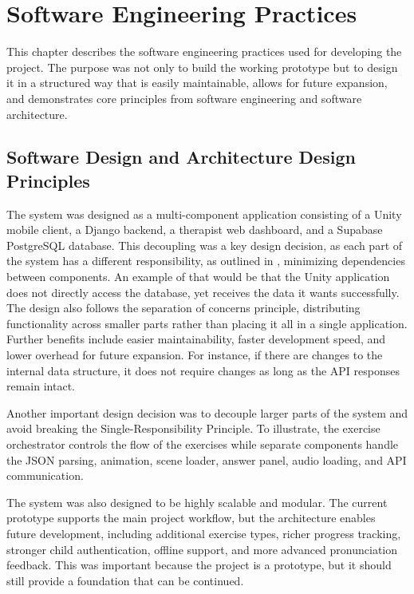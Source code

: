 \chapter{Software Engineering Practices}
\label{ch:software-engineering-practices}

This chapter describes the software engineering practices used for developing the project. The purpose was not only to build the working prototype but to design it in a structured way that is easily maintainable, allows for future expansion, and demonstrates core principles from software engineering and software architecture.

\section{Software Design and Architecture Design Principles}
\label{sec:software-design-and-architecture-design-principles}

The system was designed as a multi-component application consisting of a Unity mobile client, a Django backend, a therapist web dashboard, and a Supabase PostgreSQL database. This decoupling was a key design decision, as each part of the system has a different responsibility, as outlined in , minimizing dependencies between components. An example of that would be that the Unity application does not directly access the database, yet receives the data it wants successfully. The design also follows the separation of concerns principle, distributing functionality across smaller parts rather than placing it all in a single application. Further benefits include easier maintainability, faster development speed, and lower overhead for future expansion. For instance, if there are changes to the internal data structure, it does not require changes as long as the API responses remain intact.

Another important design decision was to decouple larger parts of the system and avoid breaking the Single-Responsibility Principle. To illustrate, the exercise orchestrator controls the flow of the exercises while separate components handle the JSON parsing, animation, scene loader, answer panel, audio loading, and API communication.

The system was also designed to be highly scalable and modular. The current prototype supports the main project workflow, but the architecture enables future development, including additional exercise types, richer progress tracking, stronger child authentication, offline support, and more advanced pronunciation feedback. This was important because the project is a prototype, but it should still provide a foundation that can be continued.

